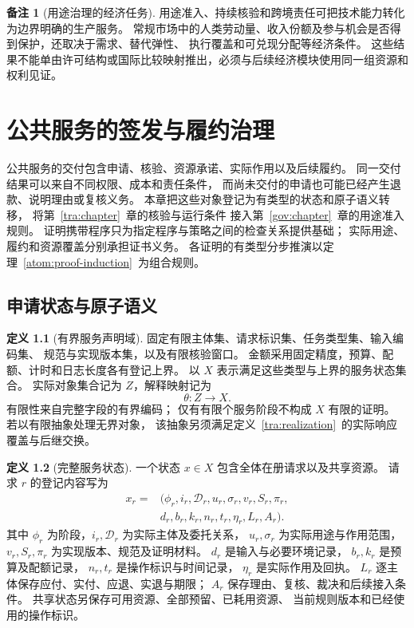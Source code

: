 \documentclass[UTF8,12pt,a4paper,openany,fontset=none,zihao=false]{ctexrep}
\theoremstyle{definition}
\newtheorem{definition}{定义}[chapter]
\newtheorem{remark}{备注}[chapter]
\newcommand{\1}{\mathbf 1}
\begin{document}
\begin{remark}[用途治理的经济任务]
用途准入、持续核验和跨境责任可把技术能力转化为边界明确的生产服务。
常规市场中的人类劳动量、收入份额及参与机会是否得到保护，还取决于需求、替代弹性、
执行覆盖和可兑现分配等经济条件。
这些结果不能单由许可结构或国际比较映射推出，必须与后续经济模块使用同一组资源和权利见证。
\end{remark}

\chapter{公共服务的签发与履约治理}
\label{integrated:public-services}
\label{svc:chapter}

公共服务的交付包含申请、核验、资源承诺、实际作用以及后续履约。
同一交付结果可以来自不同权限、成本和责任条件，
而尚未交付的申请也可能已经产生退款、说明理由或复核义务。
本章把这些对象登记为有类型的状态和原子语义转移，
将第~\ref{tra:chapter}~章的核验与运行条件
接入第~\ref{gov:chapter}~章的用途准入规则。
证明携带程序只为指定程序与策略之间的检查关系提供基础；
实际用途、履约和资源覆盖分别承担证书义务\cite{Necula1997}。
各证明的有类型分步推演以定理~\ref{atom:proof-induction}~为组合规则。

\section{申请状态与原子语义}

\begin{definition}[有界服务声明域]
\label{svc:domain}
固定有限主体集、请求标识集、任务类型集、输入编码集、
规范与实现版本集，以及有限核验窗口。
金额采用固定精度，预算、配额、计时和日志长度各有登记上界。
以 \(X\) 表示满足这些类型与上界的服务状态集合。
实际对象集合记为 \(Z\)，解释映射记为
\[
\theta:Z\longrightarrow X.
\]
有限性来自完整字段的有界编码；
仅有有限个服务阶段不构成 \(X\) 有限的证明。
若以有限抽象处理无界对象，
该抽象另须满足定义~\ref{tra:realization}~的实际响应覆盖与后继交换。
\end{definition}

\begin{definition}[完整服务状态]
\label{svc:state}
一个状态 \(x\in X\) 包含全体在册请求以及共享资源。
请求 \(r\) 的登记内容写为
\[
\begin{aligned}
x_r={}&
(\phi_r,i_r,\mathcal D_r,u_r,\sigma_r,v_r,S_r,\pi_r,\\
&d_r,b_r,k_r,n_r,t_r,\eta_r,L_r,A_r).
\end{aligned}
\]
其中 \(\phi_r\) 为阶段，\(i_r,\mathcal D_r\) 为实际主体及委托关系，
\(u_r,\sigma_r\) 为实际用途与作用范围，
\(v_r,S_r,\pi_r\) 为实现版本、规范及证明材料。
\(d_r\) 是输入与必要环境记录，
\(b_r,k_r\) 是预算及配额记录，
\(n_r,t_r\) 是操作标识与时间记录，
\(\eta_r\) 是实际作用及回执。
\(L_r\) 逐主体保存应付、实付、应退、实退与期限；
\(A_r\) 保存理由、复核、裁决和后续接入条件。
共享状态另保存可用资源、全部预留、已耗用资源、
当前规则版本和已经使用的操作标识。
\end{definition}
\end{document}
